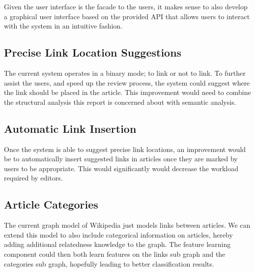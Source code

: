 Given the user interface is the facade to the users, it makes sense to also develop a graphical user interface based on the provided API that allows users to interact with the system in an intuitive fashion.

\subsection{Precise Link Location Suggestions}
The current system operates in a binary mode; to link or not to link. To further assist the users, and speed up the review process, the system could suggest where the link should be placed in the article. This improvement would need to combine the structural analysis this report is concerned about with semantic analysis.

\subsection{Automatic Link Insertion}
Once the system is able to suggest precise link locations, an improvement would be to automatically insert suggested links in articles once they are marked by users to be appropriate. This would significantly would decrease the workload required by editors.

\subsection{Article Categories}
The current graph model of Wikipedia just models links between articles. We can extend this model to also include categorical information on articles, hereby adding additional relatedness knowledge to the graph. The feature learning component could then both learn features on the links sub graph and the categories sub graph, hopefully leading to better classification results.
